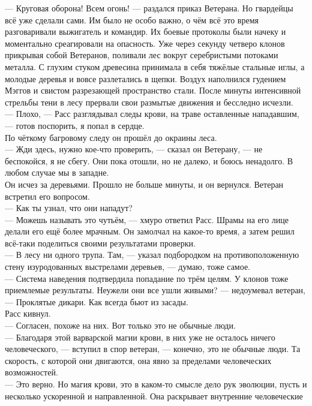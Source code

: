 \noindent --- Круговая оборона! Всем огонь! --- раздался приказ Ветерана. Но 
гвардейцы всё уже сделали сами. Им было не особо важно, о чём всё это время 
разговаривали выжигатель и командир. Их боевые протоколы были начеку и 
моментально среагировали на опасность. Уже через секунду четверо клонов 
прикрывая собой Ветеранов, поливали лес вокруг серебристыми потоками металла. С 
глухим стуком древесина принимала в себя тяжёлые стальные иглы, а молодые 
деревья и вовсе разлетались в щепки. Воздух наполнился гудением Мэггов и свистом 
разрезающей пространство стали. После минуты интенсивной стрельбы тени в лесу 
прервали свои размытые движения и бесследно исчезли.\\
--- Плохо, --- Расс разглядывал следы крови, на траве оставленные нападавшим, 
--- готов поспорить, я попал в сердце.\\ 
По чёткому багровому следу он прошёл до окраины леса.\\
--- Жди здесь, нужно кое-что проверить, --- сказал он Ветерану, --- не 
беспокойся, я не сбегу. Они пока отошли, но не далеко, и боюсь ненадолго. В 
любом случае мы в западне.\\
Он исчез за деревьями. Прошло не больше минуты, и он вернулся. Ветеран встретил 
его вопросом.\\
--- Как ты узнал, что они нападут?\\
--- Можешь называть это чутьём, --- хмуро ответил Расс. Шрамы на его лице 
делали его ещё более мрачным. Он замолчал на какое-то время, а затем решил 
всё-таки поделиться своими результатами проверки. \\
--- В лесу ни одного трупа. Там, --- указал подбородком на противоположенную 
стену изуродованных выстрелами деревьев, --- думаю, тоже самое.\\
--- Система наведения подтвердила попадание по трём целям. У клонов тоже 
приемлемые результаты. Неужели они все ушли живыми? --- недоумевал ветеран, --- 
Проклятые дикари. Как всегда бьют из засады.\\
Расс кивнул.\\
--- Согласен, похоже на них. Вот только это не обычные люди.\\
--- Благодаря этой варварской магии крови, в них  уже не осталось ничего 
человеческого, --- вступил в спор ветеран, --- конечно, это не обычные люди. Та 
скорость, с которой они двигаются, она явно за пределами человеческих 
возможностей. \\
--- Это верно. Но магия крови, это в каком-то смысле дело рук эволюции, пусть и 
несколько ускоренной и направленной. Она раскрывает внутренние человеческие 
